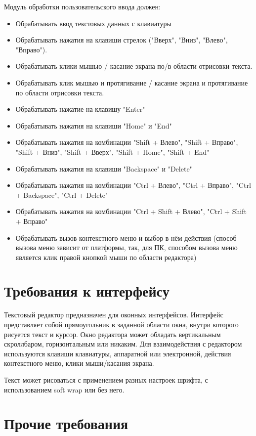 \documentclass{fefu}
\begin{document}
		\par Модуль обработки пользовательского ввода должен:
		\begin{itemize}
			\item Обрабатывать ввод текстовых данных с клавиатуры
			\item Обрабатывать нажатия на клавиши стрелок 
			("Вверх", "Вниз", "Влево", "Вправо").
			\item Обрабатывать клики мышью / касание экрана по/в области отрисовки текста.
			\item Обрабатывать клик мышью и протягивание / касание экрана и протягивание по 
			области отрисовки текста.
			\item Обрабатывать нажатие на клавишу "Enter"
			\item Обрабатывать нажатия на клавиши "Home" и "End"
			\item Обрабатывать нажатия на комбинации "Shift + Влево", "Shift + Вправо", 
			"Shift + Вниз", "Shift + Вверх", "Shift + Home", "Shift + End"
			\item Обрабатывать нажатия на клавиши "Backspace" и "Delete"
			\item Обрабатывать нажатия на комбинации "Ctrl + Влево", "Ctrl + Вправо", 
			"Ctrl + Backspace", "Ctrl + Delete"
			\item Обрабатывать нажатия на комбинации "Ctrl + Shift + Влево", 
			"Ctrl + Shift + Вправо"
			\item Обрабатывать вызов контекстного меню и выбор в нём действия (способ вызова
			меню зависит от платформы, так, для ПК, способом вызова меню является клик правой
			кнопкой мыши по области редактора)
		\end{itemize}
	\section{Требования к интерфейсу}
		\par Текстовый редактор предназначен для оконных интерфейсов. Интерфейс представляет
		собой прямоугольник в заданной области окна, внутри которого рисуется текст и курсор. Окно редактора может обладать 
		вертикальным скроллбаром, горизонтальным или никаким. Для взаимодействия с редактором
		используются клавиши клавиатуры, 
		аппаратной или электронной, действия контекстного меню, клики мыши/касания экрана.
		\par Текст может рисоваться с применением разных настроек шрифта, с использованием soft
		wrap или без него.
	\section{Прочие требования}
\end{document}
